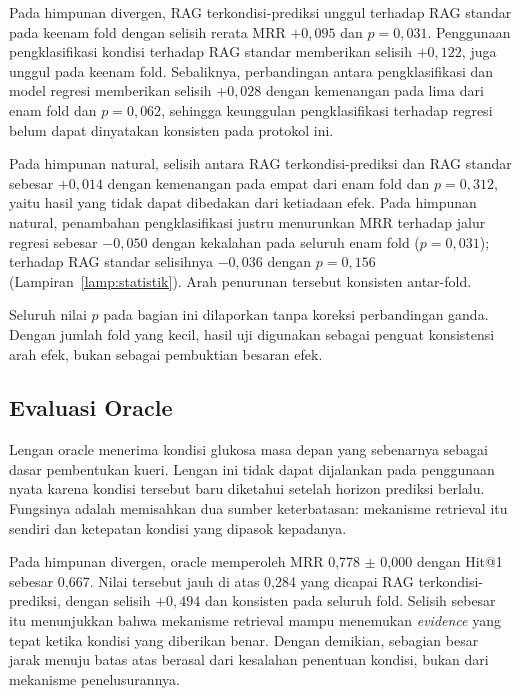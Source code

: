 

Pada himpunan divergen, RAG terkondisi-prediksi unggul terhadap RAG standar pada keenam fold dengan selisih rerata MRR $+0,095$ dan $p=0,031$. Penggunaan
pengklasifikasi kondisi terhadap RAG standar memberikan selisih $+0,122$, juga unggul pada keenam fold. Sebaliknya, perbandingan antara pengklasifikasi dan
model regresi memberikan selisih $+0,028$ dengan kemenangan pada lima dari enam fold dan $p=0,062$, sehingga keunggulan pengklasifikasi terhadap regresi belum
dapat dinyatakan konsisten pada protokol ini.

Pada himpunan natural, selisih antara RAG terkondisi-prediksi dan RAG standar sebesar $+0,014$ dengan kemenangan pada empat dari enam fold dan $p=0,312$, yaitu
hasil yang tidak dapat dibedakan dari ketiadaan efek. Pada himpunan natural, penambahan pengklasifikasi justru menurunkan MRR terhadap jalur regresi sebesar
$-0,050$ dengan kekalahan pada seluruh enam fold ($p=0,031$); terhadap RAG standar selisihnya $-0,036$ dengan $p=0,156$ (Lampiran~\ref{lamp:statistik}). Arah penurunan tersebut
konsisten antar-fold.

Seluruh nilai $p$ pada bagian ini dilaporkan tanpa koreksi perbandingan ganda. Dengan jumlah fold yang kecil, hasil uji digunakan sebagai penguat konsistensi
arah efek, bukan sebagai pembuktian besaran efek.

\subsection{Evaluasi Oracle}
\label{subsec:bab6-oracle-evaluation}

Lengan oracle menerima kondisi glukosa masa depan yang sebenarnya sebagai dasar pembentukan kueri. Lengan ini tidak dapat dijalankan pada penggunaan nyata karena
kondisi tersebut baru diketahui setelah horizon prediksi berlalu. Fungsinya adalah memisahkan dua sumber keterbatasan: mekanisme retrieval itu sendiri dan ketepatan kondisi yang dipasok kepadanya.

Pada himpunan divergen, oracle memperoleh MRR 0,778 $\pm$ 0,000 dengan Hit@1 sebesar 0,667. Nilai tersebut jauh di atas 0,284 yang dicapai RAG terkondisi-prediksi,
dengan selisih $+0,494$ dan konsisten pada seluruh fold. Selisih sebesar itu menunjukkan bahwa mekanisme retrieval mampu menemukan \textit{evidence} yang tepat ketika kondisi yang diberikan benar. Dengan
demikian, sebagian besar jarak menuju batas atas berasal dari kesalahan penentuan kondisi, bukan dari mekanisme penelusurannya.


